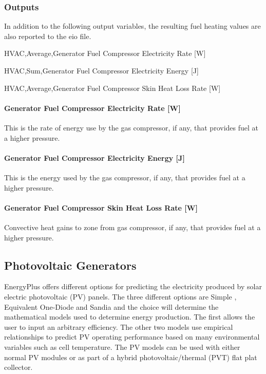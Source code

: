 \subsubsection{Outputs}\label{outputs-10-001}

In addition to the following output variables, the resulting fuel heating values are also reported to the eio file.

HVAC,Average,Generator Fuel Compressor Electricity Rate {[}W{]}

HVAC,Sum,Generator Fuel Compressor Electricity Energy {[}J{]}

HVAC,Average,Generator Fuel Compressor Skin Heat Loss Rate {[}W{]}

\paragraph{Generator Fuel Compressor Electricity Rate {[}W{]}}\label{generator-fuel-compressor-electric-power-w-1}

This is the rate of energy use by the gas compressor, if any, that provides fuel at a higher pressure.

\paragraph{Generator Fuel Compressor Electricity Energy {[}J{]}}\label{generator-fuel-compressor-electric-energy-j-1}

This is the energy used by the gas compressor, if any, that provides fuel at a higher pressure.

\paragraph{Generator Fuel Compressor Skin Heat Loss Rate {[}W{]}}\label{generator-fuel-compressor-skin-heat-loss-rate-w-1}

Convective heat gains to zone from gas compressor, if any, that provides fuel at a higher pressure.

\subsection{Photovoltaic Generators}\label{photovoltaic-generators}

EnergyPlus offers different options for predicting the electricity produced by solar electric photovoltaic (PV) panels. The three different options are Simple , Equivalent One-Diode and Sandia and the choice will determine the mathematical models used to determine energy production. The first allows the user to input an arbitrary efficiency. The other two models use empirical relationships to predict PV operating performance based on many environmental variables such as cell temperature. The PV models can be used with either normal PV modules or as part of a hybrid photovoltaic/thermal (PVT) flat plat collector.

